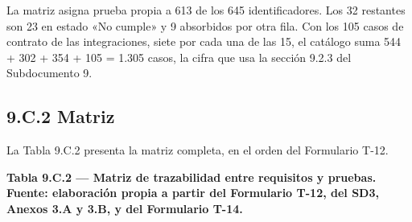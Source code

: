 La matriz asigna prueba propia a 613 de los 645 identificadores. Los 32 restantes son 23 en estado «No cumple» y 9 absorbidos por otra fila. Con los 105 casos de contrato de las integraciones, siete por cada una de las 15, el catálogo suma 544 + 302 + 354 + 105 = 1.305 casos, la cifra que usa la sección 9.2.3 del Subdocumento 9.

\subsection*{9.C.2 Matriz}

La Tabla 9.C.2 presenta la matriz completa, en el orden del Formulario T-12.

\textbf{Tabla 9.C.2 — Matriz de trazabilidad entre requisitos y pruebas. Fuente: elaboración propia a partir del Formulario T-12, del SD3, Anexos 3.A y 3.B, y del Formulario T-14.}

